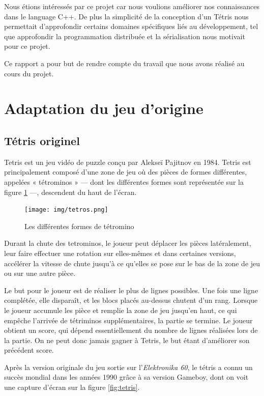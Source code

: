 \documentclass[a4paper, 12pt]{article}
\begin{document}
	\bigskip
	Nous étions intéressés par ce projet car nous voulions améliorer nos connaissances dans le language C++. De plus la simplicité de la conception d'un Tétris nous permettait d'approfondir certains domaines spécifiques liés au développement, tel que approfondir la programmation distribuée et la sérialisation nous motivait pour ce projet.

	\bigskip
	Ce rapport a pour but de rendre compte du travail que nous avons réalisé au cours du projet.

	\newpage

\section{Adaptation du jeu d'origine}
	\subsection{Tétris originel}		


		Tetris est un jeu vidéo de puzzle conçu par Alekseï Pajitnov en 1984. Tetris est principalement composé d'une zone de jeu où des pièces de formes différentes, appelées « tétrominos » --- dont les différentes formes sont représentée sur la figure \ref{fig:tetros} ---, descendent du haut de l'écran. 
		
		\begin{figure}[tb]
			\centering
			\texttt{[image: img/tetros.png]}
			\caption{Les différentes formes de tétromino}
			\label{fig:tetros}
		\end{figure}

		Durant la chute des tetrominos, le joueur peut déplacer les pièces latéralement, leur faire effectuer une rotation sur elles-mêmes et dans certaines versions, accélérer la vitesse de chute jusqu'à ce qu'elles se pose sur le bas de la zone de jeu ou sur une autre pièce. 
		
		Le but pour le joueur est de réaliser le plus de lignes possibles. Une fois une ligne complétée, elle disparaît, et les blocs placés au-dessus chutent d'un rang. 
		Lorsque le joueur accumule les pièce et remplie la zone de jeu jusqu’en haut, ce qui empêche l'arrivée de tétriminos supplémentaires, la partie se termine. Le joueur obtient un score, qui dépend essentiellement du nombre de lignes réalisées lors de la partie. On ne peut donc jamais gagner à Tetris, le but étant d’améliorer son précédent score.

		Après la version originale du jeu sortie sur l'\textit{Elektronika 60}, le tétris a connu un succès mondial dans les années 1990 grâce à sa version Gameboy, dont on voit une capture d'écran sur la figure \ref{fig:tetris}.
\end{document}
